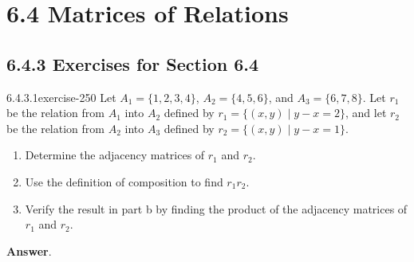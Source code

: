 \documentclass[twoside,10pt,]{book}
\numberwithin{equation}{section}
\begin{document}
\section*{6.4 Matrices of Relations}
\subsection*{6.4.3 Exercises for Section 6.4}
\begin{divisionsolution}{6.4.3.1}{}{exercise-250}%
\hypertarget{p-2138}{}%
Let \(A_1 = \{1,2, 3, 4\}\), \(A_2 = \{4, 5, 6\}\), and \(A_3 = \{6, 7, 8\}\). Let \(r_1\) be the relation from \(A_1\) into \(A_2\) defined by \(r_1 = \{(x, y)  \mid  y - x = 2\}\), and let \(r_2\) be the relation from \(A_2\) into \(A_3\) defined by \(r_2 = \{(x, y) \mid  y - x = 1\}\).%
\par
\hypertarget{p-2139}{}%
\leavevmode%
\begin{enumerate}[label=(\alph*)]
\item\hypertarget{li-1130}{}\hypertarget{p-2140}{}%
Determine the adjacency matrices of \(r_1\) and \(r_2\).%
\item\hypertarget{li-1131}{}\hypertarget{p-2141}{}%
Use the definition of composition to find \(r_1r_2\).%
\item\hypertarget{li-1132}{}\hypertarget{p-2142}{}%
Verify the result in part b by finding the product of the adjacency matrices of \(r_1\) and \(r_2\).%
\end{enumerate}
%
\par\smallskip%
\noindent\textbf{Answer}.\quad%
\hypertarget{p-2143}{}%
\leavevmode%
\end{divisionsolution}
\end{document}

